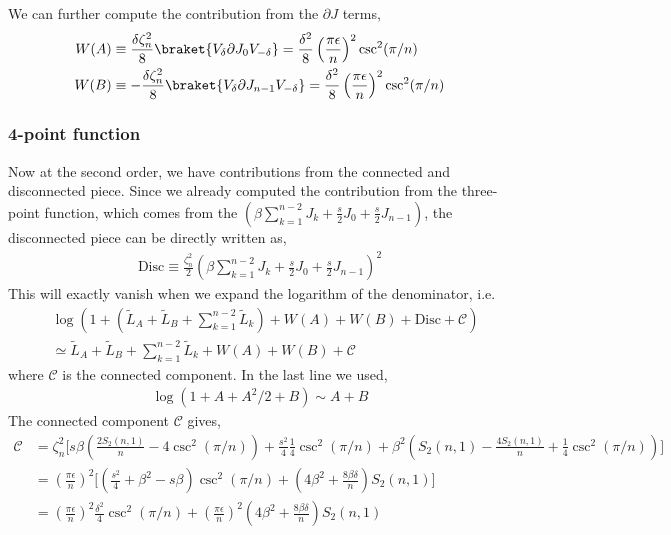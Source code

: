 \documentclass[11pt]{article}
\newcommand{\ep}{\epsilon}
\newcommand{\p}{\partial}
\newcommand{\lb}{\left(}
\newcommand{\rb}{\right)}
\begin{document}
We can further compute the contribution from the $\p J$ terms,
\begin{align}
    W(A) &\equiv \frac{\delta \zeta_n^2}{8}\braket{V_\delta \p J_0 V_{-\delta}} = \frac{\delta^2}{8}\lb\frac{\pi \ep}{n}\rb^2 \csc^2 (\pi/n) \\
    W(B) &\equiv -\frac{\delta \zeta_n^2}{8}\braket{V_\delta \p J_{n-1} V_{-\delta}} = \frac{\delta^2}{8}\lb\frac{\pi \ep}{n}\rb^2 \csc^2 (\pi/n)  
\end{align}

\subsubsection{4-point function}
Now at the second order, we have contributions from the connected and disconnected piece.
Since we already computed the contribution from the three-point function, which comes from the 
$(\beta \sum_{k=1}^{n-2}J_k + \frac{s}{2}J_0 + \frac{s}{2}J_{n-1})$, the disconnected piece can be directly written as,
\begin{align}
    \text{Disc} \equiv \frac{\zeta_n^2}{2}\lb \beta \sum_{k=1}^{n-2}J_k + \frac{s}{2}J_0 + \frac{s}{2}J_{n-1}\rb^2
\end{align}
This will exactly vanish when we expand the logarithm of the denominator, i.e.
\begin{align}
    &\log \lb 1+ \lb \tilde{L}_A + \tilde{L}_B + \sum_{k=1}^{n-2}\tilde{L}_k\rb  + W(A)+ W(B)+ \text{Disc} + \mathcal{C}\rb \\
    &\simeq  \tilde{L}_A + \tilde{L}_B + \sum_{k=1}^{n-2}\tilde{L}_k  + W(A)+ W(B) +\mathcal{C}
\end{align}
where $\mathcal{C}$ is the connected component. In the last line we used,
\begin{align}
    \log (1 + A + A^2/2 + B) \sim A + B
\end{align}
The connected component $\mathcal{C}$ gives,
\begin{align}
    \mathcal{C} &= \zeta_n^2 \Bigg[ s\beta \lb \frac{2S_2(n,1)}{n} - 4\csc^2(\pi/n)  \rb   + \frac{s^2}{4}\frac{1}{4}\csc^2(\pi/n) + \beta^2 \lb S_2(n,1) -\frac{4S_2(n,1)}{n} + \frac{1}{4}\csc^2(\pi/n)\rb\Bigg]  \\
    &=\lb\frac{\pi \ep}{n}\rb^2\Bigg[\lb \frac{s^2}{4}+\beta^2 - s\beta\rb \csc^2(\pi/n) + \lb4\beta^2 + \frac{8\beta \delta}{n}\rb S_2(n,1)\Bigg] \\
    &= \lb\frac{\pi \ep}{n}\rb^2 \frac{\delta^2}{4}\csc^2(\pi/n) + \lb\frac{\pi \ep}{n}\rb^2 \lb4\beta^2 + \frac{8\beta \delta}{n}\rb S_2(n,1)
\end{align}
\end{document}

